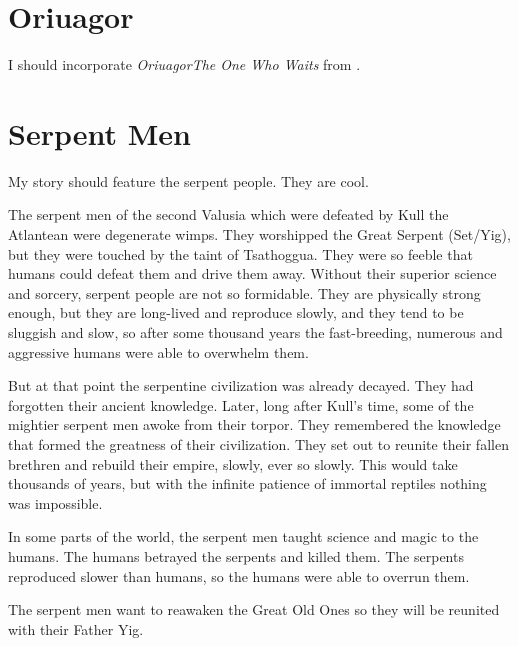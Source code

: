 \documentclass[a4paper,12pt,openany,oneside]{book}
\begin{document}
\section{Oriuagor}
I should incorporate \emph{Oriuagor\dash The One Who Waits} from \cite{PalleVibe:OriuagorsProfeti}. 















\section{Serpent Men}
My story should feature the serpent people.
They are cool. 

The serpent men of the second Valusia which were defeated by Kull the Atlantean were degenerate wimps. 
They worshipped the Great Serpent (Set/Yig), but they were touched by the taint of Tsathoggua. 
They were so feeble that humans could defeat them and drive them away. 
Without their superior science and sorcery, serpent people are not so formidable. 
They are physically strong enough, but they are long-lived and reproduce slowly, and they tend to be sluggish and slow, so after some thousand years the fast-breeding, numerous and aggressive humans were able to overwhelm them. 

But at that point the serpentine civilization was already decayed. 
They had forgotten their ancient knowledge. 
Later, long after Kull's time, some of the mightier serpent men awoke from their torpor. 
They remembered the knowledge that formed the greatness of their civilization.
They set out to reunite their fallen brethren and rebuild their empire, slowly, ever so slowly. 
This would take thousands of years, but with the infinite patience of immortal reptiles nothing was impossible. 

In some parts of the world, the serpent men taught science and magic to the humans.
The humans betrayed the serpents and killed them.
The serpents reproduced slower than humans, so the humans were able to overrun them. 

The serpent men want to reawaken the Great Old Ones so they will be reunited with their Father Yig. 
\end{document}
